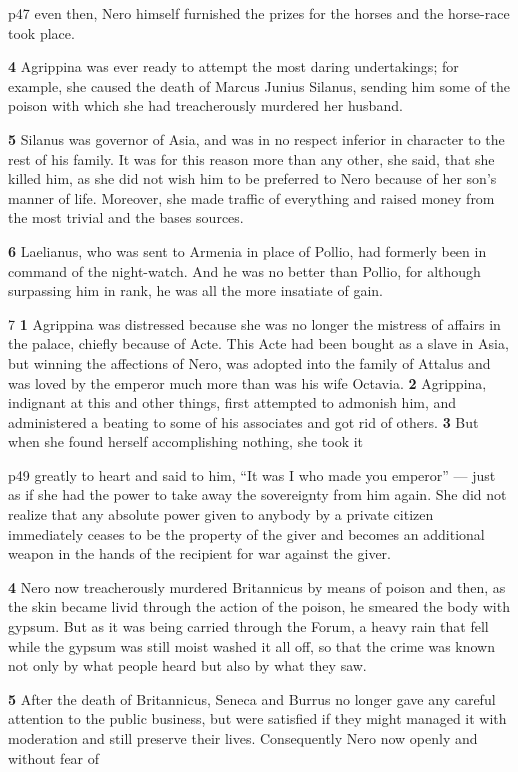 p47 even then, Nero himself furnished the prizes for the horses and the horse-race took place.

\textbf{4} Agrippina was ever ready to attempt the most daring undertakings; for example, she caused the death of Marcus Junius Silanus, sending him some of the poison with which she had treacherously murdered her husband.

\textbf{5} Silanus was governor of Asia, and was in no respect inferior in character to the rest of his family. It was for this reason more than any other, she said, that she killed him, as she did not wish him to be preferred to Nero because of her son's manner of life. Moreover, she made traffic of everything and raised money from the most trivial and the bases sources.

\textbf{6} Laelianus, who was sent to Armenia in place of Pollio, had formerly been in command of the night-watch. And he was no better than Pollio, for although surpassing him in rank, he was all the more insatiate of gain.

7 \textbf{1} Agrippina was distressed because she was no longer the mistress of affairs in the palace, chiefly because of Acte. This Acte had been bought as a slave in Asia, but winning the affections of Nero, was adopted into the family of Attalus and was loved by the emperor much more than was his wife Octavia. \textbf{2} Agrippina, indignant at this and other things, first attempted to admonish him, and administered a beating to some of his associates and got rid of others. \textbf{3} But when she found herself accomplishing nothing, she took it

p49 greatly to heart and said to him, ``It was I who made you emperor'' \texthebrew{—} just as if she had the power to take away the sovereignty from him again. She did not realize that any absolute power given to anybody by a private citizen immediately ceases to be the property of the giver and becomes an additional weapon in the hands of the recipient for war against the giver.

\textbf{4} Nero now treacherously murdered Britannicus by means of poison and then, as the skin became livid through the action of the poison, he smeared the body with gypsum. But as it was being carried through the Forum, a heavy rain that fell while the gypsum was still moist washed it all off, so that the crime was known not only by what people heard but also by what they saw.

\textbf{5} After the death of Britannicus, Seneca and Burrus no longer gave any careful attention to the public business, but were satisfied if they might managed it with moderation and still preserve their lives. Consequently Nero now openly and without fear of

